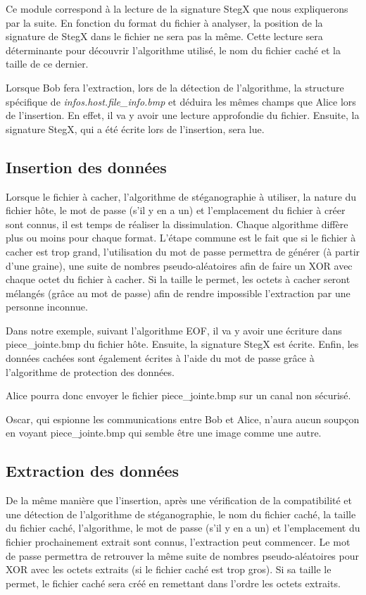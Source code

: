 \documentclass[11pt]{article}
\begin{document}
Ce module correspond à la lecture de la signature StegX que nous expliquerons 
par la suite. En fonction du format
du fichier à analyser, la position de la signature de StegX dans le fichier ne
sera pas la même. Cette lecture sera déterminante pour découvrir l'algorithme
utilisé, le nom du fichier caché et la taille de ce dernier. 

Lorsque Bob fera l'extraction, lors de la détection de l'algorithme, la 
structure spécifique de \textit{infos.host.file\_info.bmp}
et déduira les mêmes champs que Alice lors de l'insertion. En effet, 
il va y avoir une lecture approfondie du fichier. Ensuite, la signature 
StegX, qui a été écrite lors de l'insertion, sera lue.

\subsection{Insertion des données}

Lorsque le fichier à cacher, l'algorithme de stéganographie à utiliser, 
la nature du fichier hôte, le mot de passe (s'il y en a un) et l'emplacement 
du fichier à créer sont connus, il est temps de réaliser la dissimulation. 
Chaque algorithme diffère plus ou moins pour chaque format. 
L'étape commune est le fait que si le fichier à cacher est trop grand, 
l'utilisation du mot de passe permettra de générer (à partir d'une graine), 
une suite de nombres pseudo-aléatoires afin de faire un XOR avec chaque 
octet du fichier à cacher. Si la taille le permet, les octets à cacher 
seront mélangés (grâce au mot de passe) afin de rendre impossible l'extraction 
par une personne inconnue. 

Dans notre exemple, suivant l'algorithme EOF, il va y avoir une écriture 
dans piece\_jointe.bmp du fichier hôte. 
Ensuite, la signature StegX est écrite. 
Enfin, les données cachées sont également écrites à l'aide du mot de passe
grâce à l'algorithme de protection des données. 

Alice pourra donc envoyer le fichier piece\_jointe.bmp sur un canal non 
sécurisé. 

Oscar, qui espionne les communications entre Bob et Alice, n'aura aucun 
soupçon en voyant piece\_jointe.bmp qui semble être une image comme une 
autre. 

\subsection{Extraction des données}

De la même manière que l'insertion, 
après une vérification de la compatibilité et une détection de l'algorithme 
de stéganographie, le nom du fichier caché, la taille du fichier caché, 
l'algorithme, le mot de passe (s'il y en a un) et l'emplacement du fichier 
prochainement extrait sont connus, l'extraction peut commencer. 
Le mot de passe permettra de retrouver la même suite de nombres pseudo-aléatoires 
pour XOR avec les octets extraits (si le fichier caché est trop gros). 
Si sa taille le permet, le fichier caché sera créé en remettant dans l'ordre 
les octets extraits. 
\end{document}
